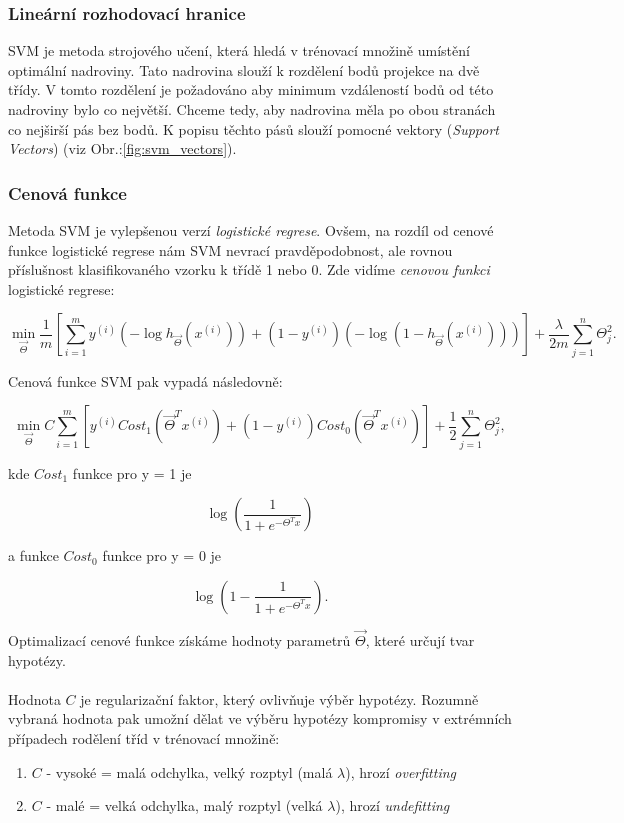 \documentclass[a4]{article}
\begin{document}
\subsubsection{Lineární rozhodovací hranice}
SVM je metoda strojového učení, která hledá v trénovací množině umístění optimální nadroviny. Tato nadrovina slouží k rozdělení bodů projekce na dvě třídy. V tomto rozdělení je požadováno aby minimum vzdáleností bodů od této nadroviny bylo co největší. Chceme tedy, aby nadrovina měla po obou stranách co nejširší pás bez bodů. K popisu těchto pásů slouží pomocné vektory (\textit{Support Vectors}) (viz Obr.:\ref{fig:svm_vectors}).
\cite{svm_zcu}

\subsubsection{Cenová funkce}
Metoda SVM je vylepšenou verzí \textit{logistické regrese}. Ovšem, na rozdíl od cenové funkce logistické regrese nám SVM nevrací pravděpodobnost, ale rovnou příslušnost klasifikovaného vzorku k třídě 1 nebo 0. Zde vidíme \textit{cenovou funkci} logistické regrese:

$$\min_{\vec{\Theta}} \frac{1}{m}[\sum_{i=1}^{m}y^{(i)}(-\log h_{\vec{\Theta}}(x^{(i)}))+(1-y^{(i)})(-\log(1-h_{\vec{\Theta}}(x^{(i)})))]+\frac{\lambda}{2m}\sum_{j=1}^{n}\Theta_{j}^{2}.$$

\noindent Cenová funkce SVM pak vypadá následovně:

$$\min_{\vec{\Theta}} C \sum_{i=1}^{m}[y^{(i)} Cost_1 (\vec{\Theta}^T x^{(i)})+(1-y^{(i)}) Cost_0 (\vec{\Theta}^T x^{(i)})] + \frac{1}{2} \sum_{j=1}^{n}\Theta_{j}^{2},$$

\noindent kde $Cost_1$ funkce pro y = 1 je

$$\log(\frac{1}{1 + e^{-\Theta^{T}x}})$$

\noindent a funkce $Cost_0$ funkce pro y = 0 je

$$\log(1-\frac{1}{1 + e^{-\Theta^{T}x}}).$$

\noindent Optimalizací cenové funkce získáme hodnoty parametrů $\vec{\Theta}$, které určují tvar hypotézy.
\\\\
Hodnota $C$ je regularizační faktor, který ovlivňuje výběr hypotézy. Rozumně vybraná hodnota pak umožní dělat ve výběru hypotézy kompromisy v extrémních případech rodělení tříd v trénovací množině:

\begin{enumerate}
	\item $C$ - vysoké = malá odchylka, velký rozptyl (malá $\lambda$), hrozí \textit{overfitting}
	\item $C$ - malé = velká odchylka, malý rozptyl (velká $\lambda$), hrozí \textit{undefitting}
\end{enumerate}
\end{document}

